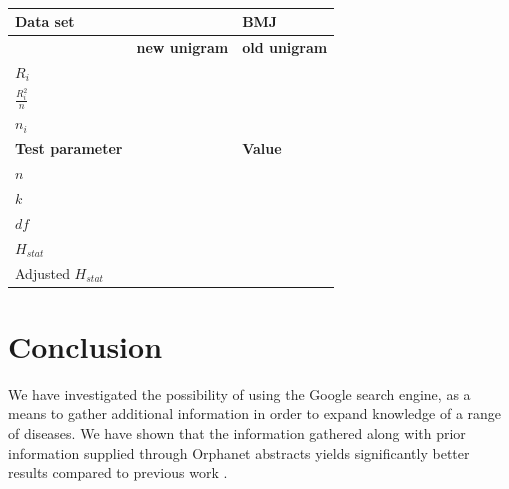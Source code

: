 \documentclass[10pt,letterpaper,final]{article}
\begin{document}
\begin{table}[here]
\begin{center}
\begin{tabular}{lll}
    \textbf{Data set} & & \textbf{BMJ} \\ \hline\hline
 &	\textbf{new unigram} &	\textbf{old unigram} \\ \hline
$R_{i}$ &	 &	 \\
$\frac{R_{i}^2}{n}$ &  &  \\
$n_{i}$		&  \\ \hline \hline
\textbf{Test parameter}	&	&\textbf{Value} \\ \hline
$n$	 &  &   \\
$k$  &  &   \\
$df$ &  &   \\ \hline \hline
$H_{stat}$  &  &   \\
Adjusted $H_{stat}$ & &  \\
\end{tabular}
    \caption{}
    \label{tab:bmj_old_new_stat}
\end{center}
\end{table}






\section{Conclusion}
\label{chap:conclusion}
We have investigated the possibility of using the Google search engine,
as a means to gather additional information in order to expand knowledge
of a range of diseases. We have shown that the information gathered
along with prior information supplied through Orphanet abstracts yields
significantly better results compared to previous work .

\end{document}
